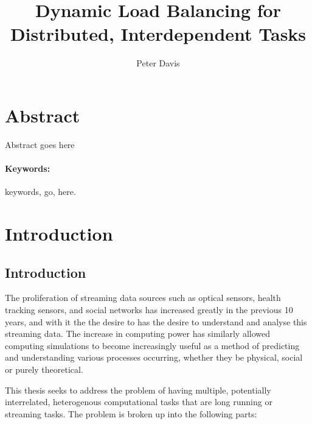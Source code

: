 \documentclass[a4paper,12pt,oldfontcommands]{memoir}
\title{Dynamic Load Balancing for Distributed, Interdependent Tasks}
\author{Peter Davis}
\begin{document}
\frontmatter
\maketitle

\pagebreak
\tableofcontents
\vfill
\pagebreak
\printglossary[type=\acronymtype,title=Abbreviations]
\vfill

\chapter{Abstract}\label{abstract}

Abstract goes here

\subsubsection{Keywords:} 
keywords, go, here.

\mainmatter

\chapter{Introduction} %

\label{Chapter1} %


\newcommand{\keyword}[1]{\textbf{#1}}
\newcommand{\tabhead}[1]{\textbf{#1}}
\newcommand{\code}[1]{\texttt{#1}}
\newcommand{\file}[1]{\texttt{\bfseries#1}}
\newcommand{\option}[1]{\texttt{\itshape#1}}

\section{Introduction}
The proliferation of streaming data sources such as optical sensors, health tracking sensors, and social networks has increased greatly in the previous 10 years, and with it the the desire to has the desire to understand and analyse this streaming data. The increase in computing power has similarly allowed computing simulations to become increasingly useful as a method of predicting and understanding various processes occurring, whether they be physical, social or purely theoretical.

This thesis seeks to address the problem of having multiple, potentially interrelated, heterogenous computational tasks that are long running or streaming tasks. The problem is broken up into the following parts:
\end{document}
